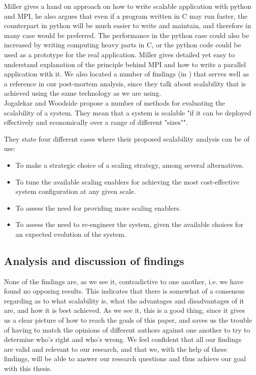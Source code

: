 \documentclass{article}
\begin{document}
Miller \cite{millerparallel}\cite{miller2002pympi} gives a hand on approach on
how to write scalable application with python and MPI, he also argues that
even if a program written in C may run faster, the counterpart in python will
be much easier to write and maintain, and therefore in many case would be
preferred. The performance in the python case could also be increased by
writing computing heavy parts in C, or the python code could be used as a 
prototype for the real application. Miller gives detailed yet easy to 
understand explanation of the principle behind MPI and how to write a
parallel application with it.
We also located a number of findings
(in \cite{gropp1996high}\cite{miller2002pympi}\cite{millerparallel}) that
serves well as a reference in our post-mortem analysis, since they talk about
scalability that is achieved using the same technology as we are using.
\\
 
Jogalekar and Woodside \cite{jogalekar2000evaluating} propose a number of
methods for evaluating the scalability of a system. They mean that a system is
scalable "if it can be deployed effectively and economically over a range of
different "sizes"". 

They state four different cases where their proposed scalability analysis can
be of use:
\begin{itemize}
\item{To make a strategic choice of a scaling strategy, among several
alternatives.}
\item{To tune the available scaling enablers for achieving the most
cost-effective system configuration at any given scale.}
\item{To assess the need for providing more scaling enablers.}
\item{To assess the need to re-engineer the system, given the available choices
for an expected evolution of the system.}
\end{itemize}


\subsection{Analysis and discussion of findings}
None of the findings are, as we see it, contradictive to one another, i.e. we
have found no opposing results.  This indicates that there is somewhat of a
consensus regarding as to what scalability is, what the advantages and
disadvantages of it are, and how it is best achieved. As we see it, this is a
good thing, since it gives us a clear picture of how to reach the goals of this
paper, and saves us the trouble of having to match the opinions of different
authors against one another to try to determine who's right and who's wrong.
We feel confident that all our findings are valid and relevant to our research,
and that we, with the help of these findings, will be able to answer our
research questions and thus achieve our goal with this thesis.
\\



\end{document}
